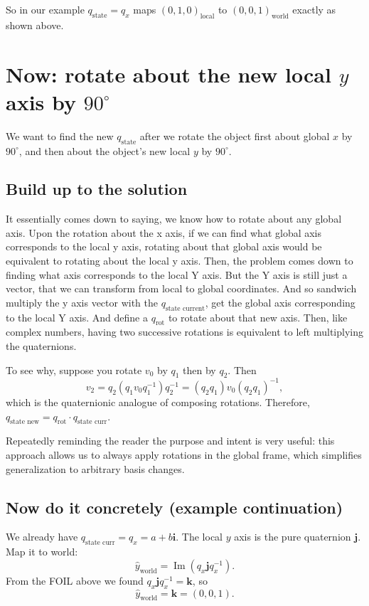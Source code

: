 \documentclass[11pt]{article}
\begin{document}
So in our example \(q_{\text{state}} = q_x\) maps \((0,1,0)_\text{local}\) to
\((0,0,1)_\text{world}\) exactly as shown above.

\section{Now: rotate about the new local \(y\) axis by \(90^\circ\)}
We want to find the new \(q_{\text{state}}\) after we rotate the object
first about global \(x\) by \(90^\circ\), and then about the object's new
local \(y\) by \(90^\circ\).

\subsection{Build up to the solution}
It essentially comes down to saying, we know how to rotate about any global axis. Upon the rotation about the x axis, if we can find what global axis corresponds to the local y axis, rotating about that global axis would be equivalent to rotating about the local y axis. Then, the problem comes down to finding what axis corresponds to the local Y axis. But the Y axis is still just a vector, that we can transform from local to global coordinates. And so sandwich multiply the y axis vector with the \(q_{\text{state current}}\), get the global axis corresponding to the local Y axis. And define a \(q_{\text{rot}}\) to rotate about that new axis. Then, like complex numbers, having two successive rotations is equivalent to left multiplying the quaternions.

To see why, suppose you rotate \(v_0\) by \(q_1\) then by \(q_2\). Then
\[
v_2 = q_2 (q_1 v_0 q_1^{-1}) q_2^{-1} = (q_2 q_1) v_0 (q_2 q_1)^{-1},
\]
which is the quaternionic analogue of composing rotations. Therefore, \(q_{\text{state new}} = q_{\text{rot}} \cdot q_{\text{state curr}}\).

Repeatedly reminding the reader the purpose and intent is very useful: this approach allows us to always apply rotations in the global frame, which simplifies generalization to arbitrary basis changes.

\subsection{Now do it concretely (example continuation)}
We already have \(q_{\text{state curr}} = q_x = a + b\mathbf{i}\).
The local \(y\) axis is the pure quaternion \(\mathbf{j}\).
Map it to world:
\[
\hat{y}_\text{world} = \operatorname{Im}(q_x \mathbf{j} q_x^{-1}).
\]
From the FOIL above we found \(q_x \mathbf{j} q_x^{-1} = \mathbf{k}\), so
\[
\hat{y}_\text{world} = \mathbf{k} = (0,0,1).
\]
\end{document}
